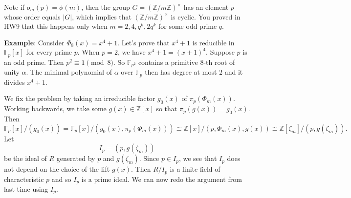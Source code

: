 \documentclass{article}
\def\Z{{\mathbb Z}}
\def\F{{\mathbb F}}
\def\Z{{\mathbb Z}}
\def\F{{\mathbb F}}
\begin{document}
Note if $o_m(p) = \phi(m)$, then the group $G = (\Z/m\Z)^\times$ has an element $p$ whose order equals $|G|$, which implies that $(\Z/m\Z)^\times$ is cyclic. You proved in HW9 that this happens only when $m = 2,4,q^k,2q^k$ for some odd prime $q$.

\vspace{5pt}
\noindent\textbf{Example}: Consider $\Phi_8(x) = x^4 + 1$. Let's prove that $x^4 + 1$ is reducible in $\F_p[x]$ for every prime $p$. When $p = 2$, we have $x^4 + 1 = (x + 1)^4$. Suppose $p$ is an odd prime. Then $p^2\equiv 1\pmod{8}$. So $\F_{p^2}$ contains a primitive $8$-th root of unity $\alpha$. The minimal polynomial of $\alpha$ over $\F_p$ then has degree at most $2$ and it divides $x^4 + 1$.

We fix the problem by taking an irreducible factor $g_0(x)$ of $\pi_p(\Phi_m(x))$. Working backwards, we take some $g(x)\in\Z[x]$ so that $\pi_p(g(x)) = g_0(x)$. Then
$$\F_p[x]/(g_0(x)) = \F_p[x]/(g_0(x),\pi_p(\Phi_m(x))) \cong \Z[x]/(p, \Phi_m(x), g(x)) \cong \Z[\zeta_m]/(p, g(\zeta_m)).$$Let $$I_p = (p, g(\zeta_m))$$
be the ideal of $R$ generated by $p$ and $g(\zeta_m)$. Since $p\in I_p$, we see that $I_p$ does not depend on the choice of the lift $g(x)$. Then $R/I_p$ is a finite field of characteristic $p$ and so $I_p$ is a prime ideal. %
We can now redo the argument from last time using $I_p$.
\end{document}

